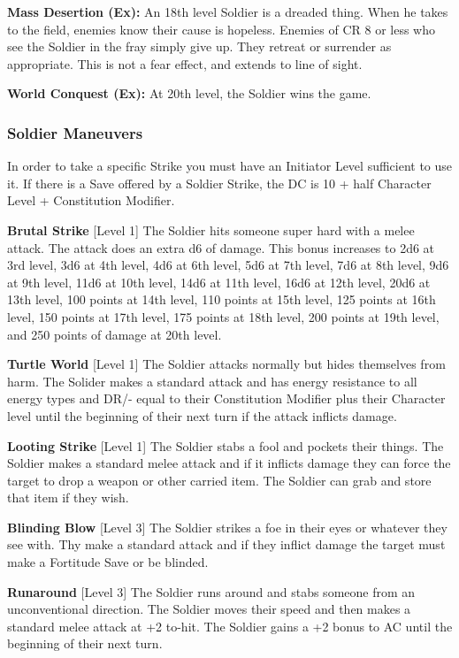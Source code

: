 \textbf{Mass Desertion (Ex):} An 18th level Soldier is a dreaded thing. When he takes to the field, enemies know their cause is hopeless. Enemies of CR 8 or less who see the Soldier in the fray simply give up. They retreat or surrender as appropriate. This is not a fear effect, and extends to line of sight.

\textbf{World Conquest (Ex):} At 20th level, the Soldier wins the game.

\subsubsection{Soldier Maneuvers}

In order to take a specific Strike you must have an Initiator Level sufficient to use it. If there is a Save offered by a Soldier Strike, the DC is 10 + half Character Level + Constitution Modifier.

\newcommand{\soldiermaneuver}[3]{\textbf{#1} [Level #2] #3\medskip{}}

\soldiermaneuver{Brutal Strike}{1}{The Soldier hits someone super hard with a melee attack. The attack does an extra d6 of damage. This bonus increases to 2d6 at 3rd level, 3d6 at 4th level, 4d6 at 6th level, 5d6 at 7th level, 7d6 at 8th level, 9d6 at 9th level, 11d6 at 10th level, 14d6 at 11th level, 16d6 at 12th level, 20d6 at 13th level, 100 points at 14th level, 110 points at 15th level, 125 points at 16th level, 150 points at 17th level, 175 points at 18th level, 200 points at 19th level, and 250 points of damage at 20th level.}

\soldiermaneuver{Turtle World}{1}{The Soldier attacks normally but hides themselves from harm. The Solider makes a standard attack and has energy resistance to all energy types and DR/- equal to their Constitution Modifier plus their Character level until the beginning of their next turn if the attack inflicts damage.}

\soldiermaneuver{Looting Strike}{1}{The Soldier stabs a fool and pockets their things. The Soldier makes a standard melee attack and if it inflicts damage they can force the target to drop a weapon or other carried item. The Soldier can grab and store that item if they wish.}

\soldiermaneuver{Blinding Blow}{3}{The Soldier strikes a foe in their eyes or whatever they see with. Thy make a standard attack and if they inflict damage the target must make a Fortitude Save or be blinded.}

\soldiermaneuver{Runaround}{3}{The Soldier runs around and stabs someone from an unconventional direction. The Soldier moves their speed and then makes a standard melee attack at +2 to-hit. The Soldier gains a +2 bonus to AC until the beginning of their next turn.}

